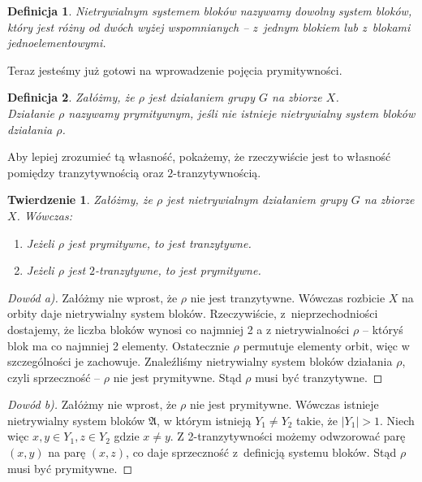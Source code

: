 \documentclass[licencjacka]{pracamgr}
\newtheorem{deff}{Definicja}[section]
\newtheorem{thh}{Twierdzenie}[section]
\begin{document}
\begin{deff}
    \emph{Nietrywialnym systemem bloków} nazywamy dowolny system bloków,
    który jest różny od dwóch wyżej wspomnianych -- z~jednym blokiem lub z~blokami jednoelementowymi.
\end{deff}

Teraz jesteśmy już gotowi na wprowadzenie pojęcia prymitywności.

\begin{deff}
    Załóżmy, że $\rho$ jest działaniem grupy $G$ na zbiorze $X$. \\
    Działanie \emph{$\rho$ nazywamy prymitywnym}, jeśli nie istnieje nietrywialny system bloków działania $\rho$.
\end{deff}

Aby lepiej zrozumieć tą własność, pokażemy, że rzeczywiście jest to
własność pomiędzy tranzytywnością oraz $2$-tranzytywnością.

\begin{thh}
    Załóżmy, że $\rho$ jest nietrywialnym działaniem grupy $G$ na zbiorze $X$. Wówczas:
    \begin{enumerate}[label=\alph*)]
     \item Jeżeli $\rho$ jest prymitywne, to jest tranzytywne.
     \item Jeżeli $\rho$ jest $2$-tranzytywne, to jest prymitywne.
    \end{enumerate}
\end{thh}

\begin{proof}[Dowód a)]
  Załóżmy nie wprost, że $\rho$ nie jest tranzytywne.
                    Wówczas rozbicie $X$ na orbity daje nietrywialny system bloków.
                    Rzeczywiście, z~nieprzechodniości dostajemy, że liczba bloków wynosi co najmniej 2 a
                    z nietrywialności $\rho$ -- któryś blok ma co najmniej 2 elementy.
                    Ostatecznie $\rho$ permutuje elementy orbit, więc w szczególności je zachowuje.
                    Znaleźliśmy nietrywialny system bloków działania $\rho$, czyli sprzeczność -- $\rho$ nie jest prymitywne.
                    Stąd $\rho$ musi być tranzytywne.
\end{proof}
\begin{proof}[Dowód b)]
     Załóżmy nie wprost, że $\rho$ nie jest prymitywne.
                    Wówczas istnieje nietrywialny system bloków $\mathfrak{A}$,
                    w którym istnieją $Y_1 \ne Y_2$ takie, że $|Y_1| > 1$.
                    Niech więc $x,y \in Y_1, z \in Y_2$ gdzie $x \ne y$.
                    Z 2-tranzytywności możemy odwzorować parę $(x, y)$ na parę $(x, z)$, co daje sprzeczność z~definicją systemu bloków.
                    Stąd $\rho$ musi być prymitywne.
\end{proof}
\end{document}
